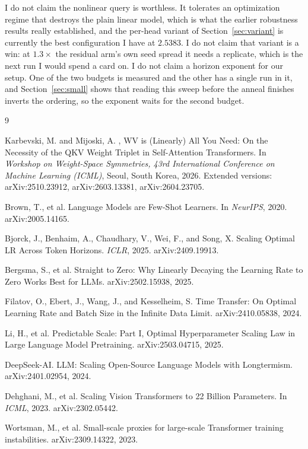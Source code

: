 \documentclass[mlabstract,onecolumn]{jmlr}
\begin{document}
I do not claim the nonlinear query is worthless. It tolerates an optimization regime that
destroys the plain linear model, which is what the earlier robustness results really
established, and the per-head variant of Section~\ref{sec:variant} is currently the best
configuration I have at $2.5383$. I do not claim that variant is a win: at $1.3\times$ the
residual arm's own seed spread it needs a replicate, which is the next run I would spend a
card on. I do not claim a horizon exponent for our setup. One of the two budgets is measured
and the other has a single run in it, and Section~\ref{sec:small} shows that reading this
sweep before the anneal finishes inverts the ordering, so the exponent waits for the second
budget.

\begin{thebibliography}{9}

Karbevski, M. and Mijoski, A.
, {WV} is ({L}inearly) All You Need: On the Necessity of the
  {QKV} Weight Triplet in Self-Attention Transformers.
\newblock In \emph{Workshop on Weight-Space Symmetries, 43rd International
  Conference on Machine Learning (ICML)}, Seoul, South Korea, 2026.
\newblock Extended versions: arXiv:2510.23912, arXiv:2603.13381, arXiv:2604.23705.

Brown, T., et al.
\newblock Language Models are Few-Shot Learners.
\newblock In \emph{NeurIPS}, 2020. arXiv:2005.14165.

Bjorck, J., Benhaim, A., Chaudhary, V., Wei, F., and Song, X.
\newblock Scaling Optimal {LR} Across Token Horizons.
\newblock \emph{ICLR}, 2025. arXiv:2409.19913.

Bergsma, S., et al.
\newblock Straight to Zero: Why Linearly Decaying the Learning Rate to Zero
  Works Best for {LLM}s.
\newblock arXiv:2502.15938, 2025.

Filatov, O., Ebert, J., Wang, J., and Kesselheim, S.
\newblock Time Transfer: On Optimal Learning Rate and Batch Size in the
  Infinite Data Limit.
\newblock arXiv:2410.05838, 2024.

Li, H., et al.
\newblock Predictable Scale: Part {I}, Optimal Hyperparameter Scaling Law in
  Large Language Model Pretraining.
\newblock arXiv:2503.04715, 2025.

DeepSeek-AI.
 {LLM}: Scaling Open-Source Language Models with Longtermism.
\newblock arXiv:2401.02954, 2024.

Dehghani, M., et al.
\newblock Scaling Vision Transformers to 22 Billion Parameters.
\newblock In \emph{ICML}, 2023. arXiv:2302.05442.

Wortsman, M., et al.
\newblock Small-scale proxies for large-scale Transformer training instabilities.
\newblock arXiv:2309.14322, 2023.

\end{thebibliography}
\end{document}
